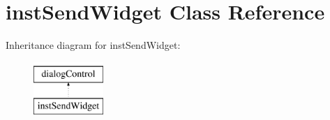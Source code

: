 \hypertarget{classinstSendWidget}{\section{inst\-Send\-Widget \-Class \-Reference}
\label{classinstSendWidget}
}
\-Inheritance diagram for inst\-Send\-Widget\-:\begin{figure}[H]
\begin{center}
\leavevmode
\includegraphics[height=2.000000cm]{classinstSendWidget}
\end{center}
\end{figure}
